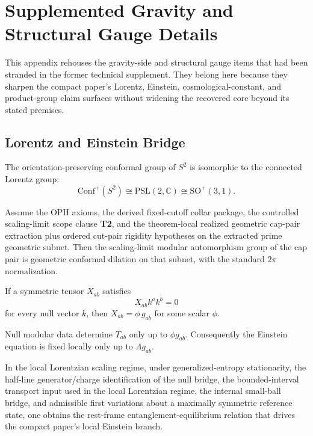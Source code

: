 \section{Supplemented Gravity and Structural Gauge Details}
\label{app:compact-technical-port}

This appendix rehouses the gravity-side and structural gauge items that had been stranded in the
former technical supplement. They belong here because they sharpen the compact paper's Lorentz,
Einstein, cosmological-constant, and product-group claim surfaces without widening the recovered
core beyond its stated premises.

\subsection{Lorentz and Einstein Bridge}

\begin{theorem}
The orientation-preserving conformal group of \(S^2\) is isomorphic to the connected Lorentz
group:
\[
\mathrm{Conf}^+(S^2)\cong \mathrm{PSL}(2,\mathbb C)\cong \mathrm{SO}^+(3,1).
\]
\end{theorem}

\begin{theorem}
Assume the OPH axioms, the derived fixed-cutoff collar package, the controlled scaling-limit
scope clause \textbf{T2}, and the theorem-local realized geometric cap-pair extraction plus
ordered cut-pair rigidity hypotheses on the extracted prime geometric subnet. Then the
scaling-limit modular automorphism group of the cap pair is geometric conformal dilation on that
subnet, with the standard \(2\pi\) normalization.
\end{theorem}

\begin{lemma}
If a symmetric tensor \(X_{ab}\) satisfies
\[
X_{ab}k^ak^b=0
\]
for every null vector \(k\), then \(X_{ab}=\phi\,g_{ab}\) for some scalar \(\phi\).
\end{lemma}

\begin{corollary}
Null modular data determine \(T_{ab}\) only up to \(\phi g_{ab}\). Consequently the Einstein
equation is fixed locally only up to \(\Lambda g_{ab}\).
\end{corollary}

\begin{theorem}
In the local Lorentzian scaling regime, under generalized-entropy stationarity, the half-line
generator/charge identification of the null bridge, the bounded-interval transport input used in
the local Lorentzian regime, the internal small-ball bridge, and admissible first variations
about a maximally symmetric reference state, one obtains the rest-frame entanglement-equilibrium
relation that drives the compact paper's local Einstein branch.
\end{theorem}

